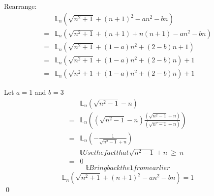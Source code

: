 \subsection{} %
    Rearrange:
    \begin{align*}
        &𝕃_{n}\left(\sqrt{n^{2}+1}+\left(n+1\right)^{2}-an^{2}-bn\right) \\
        =&𝕃_{n}\left(\sqrt{n^{2}+1}+\left(n+1\right)+n\left(n+1\right)-an^{2}-bn\right) \\
        =&𝕃_{n}\left(\sqrt{n^{2}+1}+\left(1-a\right)n^{2}+\left(2-b\right)n+1\right) \\
        =&𝕃_{n}\left(\sqrt{n^{2}+1}+\left(1-a\right)n^{2}+\left(2-b\right)n\right)+1 \\
        =&𝕃_{n}\left(\sqrt{n^{2}+1}+\left(1-a\right)n^{2}+\left(2-b\right)n\right)+1
    \end{align*}
    
    Let $a=1$ and $b=3$
    \begin{align*}
        &𝕃_{n}\left(\sqrt{n^{2}-1}-n\right) \\
        =&𝕃_{n}\left(\left(\sqrt{n^{2}-1}-n\right)\frac{\left(\sqrt{n^{2}-1}+n\right)}{\left(\sqrt{n^{2}-1}+n\right)}\right) \\
        =&𝕃_{n}\left(-\frac{1}{\sqrt{n^{2}-1}+n}\right) \\
        &𝕥{Use the fact that} \sqrt{n^{2}-1}+n\ \ge\ n \\
        =&0
    \end{align*}
    $$𝕥{Bring back the 1 from earlier}$$
    $$𝕃_{n}\left(\sqrt{n^{2}+1}+\left(n+1\right)^{2}-an^{2}-bn\right)=1$$ \qed